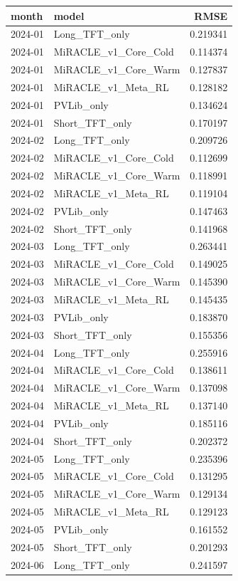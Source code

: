 \begin{tabular}{llr}
\toprule
month & model & RMSE \\
\midrule
2024-01 & Long_TFT_only & 0.219341 \\
2024-01 & MiRACLE_v1_Core_Cold & 0.114374 \\
2024-01 & MiRACLE_v1_Core_Warm & 0.127837 \\
2024-01 & MiRACLE_v1_Meta_RL & 0.128182 \\
2024-01 & PVLib_only & 0.134624 \\
2024-01 & Short_TFT_only & 0.170197 \\
2024-02 & Long_TFT_only & 0.209726 \\
2024-02 & MiRACLE_v1_Core_Cold & 0.112699 \\
2024-02 & MiRACLE_v1_Core_Warm & 0.118991 \\
2024-02 & MiRACLE_v1_Meta_RL & 0.119104 \\
2024-02 & PVLib_only & 0.147463 \\
2024-02 & Short_TFT_only & 0.141968 \\
2024-03 & Long_TFT_only & 0.263441 \\
2024-03 & MiRACLE_v1_Core_Cold & 0.149025 \\
2024-03 & MiRACLE_v1_Core_Warm & 0.145390 \\
2024-03 & MiRACLE_v1_Meta_RL & 0.145435 \\
2024-03 & PVLib_only & 0.183870 \\
2024-03 & Short_TFT_only & 0.155356 \\
2024-04 & Long_TFT_only & 0.255916 \\
2024-04 & MiRACLE_v1_Core_Cold & 0.138611 \\
2024-04 & MiRACLE_v1_Core_Warm & 0.137098 \\
2024-04 & MiRACLE_v1_Meta_RL & 0.137140 \\
2024-04 & PVLib_only & 0.185116 \\
2024-04 & Short_TFT_only & 0.202372 \\
2024-05 & Long_TFT_only & 0.235396 \\
2024-05 & MiRACLE_v1_Core_Cold & 0.131295 \\
2024-05 & MiRACLE_v1_Core_Warm & 0.129134 \\
2024-05 & MiRACLE_v1_Meta_RL & 0.129123 \\
2024-05 & PVLib_only & 0.161552 \\
2024-05 & Short_TFT_only & 0.201293 \\
2024-06 & Long_TFT_only & 0.241597 \\

\end{tabular}
